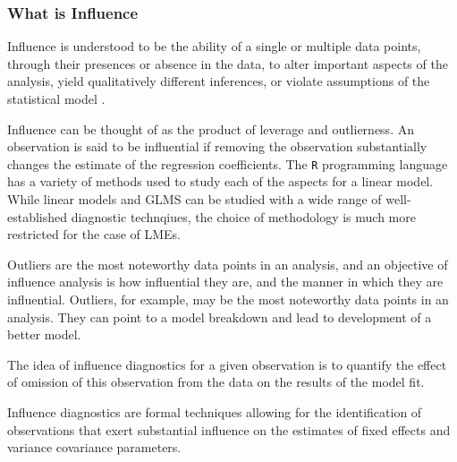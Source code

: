 \documentclass[12pt, a4paper]{report}
\theoremstyle{plain}
\theoremstyle{definition}
\theoremstyle{remark}
\begin{document}
	
	\subsubsection{What is Influence} %
	Influence is understood to be the ability of a single or multiple data points, through their presences or absence in the data, to
	alter important aspects of the analysis, yield qualitatively different inferences, or violate assumptions of the statistical
	model \citep{schabenberger}.
	
	Influence can be thought of as the product of leverage and outlierness. An observation is said to be influential if removing the observation substantially changes the estimate of the regression coefficients. The \texttt{R} programming language has a variety of methods used to study each of the aspects for a linear model. While linear models and GLMS can be studied with a wide range of well-established diagnostic technqiues, the choice of methodology is much more restricted for the case of LMEs.
	
	Outliers are the most noteworthy data points in an analysis, and an objective of influence analysis is how influential they are,
	and the manner in which they are influential. Outliers, for example, may be the most noteworthy data points in
	an analysis. They can point to a model breakdown and lead to development of a better model.
	
	
	
	
	The idea of influence diagnostics for a given observation is to quantify the effect of omission of this observation 
	from the data on the results of the model fit. %
	
	Influence diagnostics are formal techniques allowing for the identification of observations that exert substantial  influence on the estimates of fixed effects and variance covariance parameters. 
	
\end{document}
